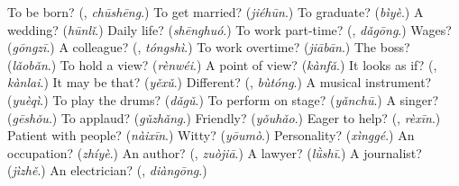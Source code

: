 \begin{tcolorbox}[breakable,colback=teal!4,colframe=teal!35!black,title={Before you move on}]
To be born? (\textbf{}, \emph{chūshēng}.) To get married? (\emph{jiéhūn}.) To graduate? (\emph{bìyè}.) A wedding? (\emph{hūnlǐ}.) Daily life? (\emph{shēnghuó}.) To work part-time? (\textbf{}, \emph{dǎgōng}.) Wages? (\emph{gōngzī}.) A colleague? (\textbf{}, \emph{tóngshì}.) To work overtime? (\emph{jiābān}.) The boss? (\emph{lǎobǎn}.) To hold a view? (\emph{rènwéi}.) A point of view? (\emph{kànfǎ}.) It looks as if? (\textbf{}, \emph{kànlai}.) It may be that? (\emph{yěxǔ}.) Different? (\textbf{}, \emph{bùtóng}.) A musical instrument? (\emph{yuèqì}.) To play the drums? (\emph{dǎgǔ}.) To perform on stage? (\emph{yǎnchū}.) A singer? (\emph{gēshǒu}.) To applaud? (\emph{gǔzhǎng}.) Friendly? (\emph{yǒuhǎo}.) Eager to help? (\textbf{}, \emph{rèxīn}.) Patient with people? (\emph{nàixīn}.) Witty? (\emph{yōumò}.) Personality? (\emph{xìnggé}.) An occupation? (\emph{zhíyè}.) An author? (\textbf{}, \emph{zuòjiā}.) A lawyer? (\emph{lǜshī}.) A journalist? (\emph{jìzhě}.) An electrician? (\textbf{}, \emph{diàngōng}.)
\end{tcolorbox}
